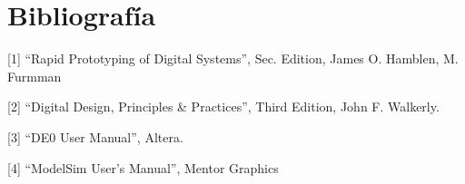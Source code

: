 \documentclass[a4paper,11pt]{article}
\begin{document}




\section{Bibliografía}
\small{
[1] ``Rapid Prototyping of Digital Systems'', Sec. Edition, James O. Hamblen, M. Furmman

[2] ``Digital Design, Principles \& Practices'', Third Edition, John F. Walkerly.

[3] ``DE0 User Manual'', Altera.

[4] ``ModelSim User's Manual'', Mentor Graphics
}
\end{document}
